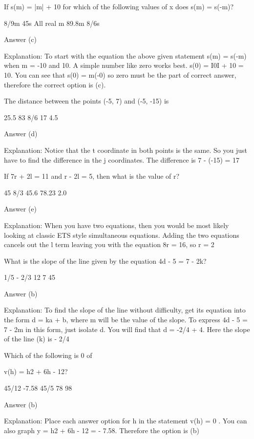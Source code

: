     If s(m) = |m| + 10 for which of the following values of x does s(m) = s(-m)?

        8/9m
        45s
        All real m
        89.8m
        8/6s 

    Answer (c)

     

    Explanation: To start with the equation the above given statement s(m) = s(-m) when m = -10 and 10. A simple number like zero works best. s(0) = Ι0Ι + 10 = 10. You can see that s(0) = m(-0) so zero must be the part of correct answer, therefore the correct option is (c).

     

    The distance between the points (-5, 7) and (-5, -15) is

        25.5
        83
        8/6
        17
        4.5 

    Answer (d)

    Explanation: Notice that the t coordinate in both points is the same. So you just have to find the difference in the j coordinates. The difference is 7 - (-15) = 17

    If 7r + 2l = 11 and r - 2l = 5, then what is the value of r?

        45
        8/3
        45.6
        78.23
        2.0 

    Answer (e)

    Explanation: When you have two equations, then you would be most likely looking at classic ETS style simultaneous equations. Adding the two equations cancels out the l term leaving you with the equation 8r = 16, so r = 2

    What is the slope of the line given by the equation 4d - 5 = 7 - 2k?

        1/5
        - 2/3
        12
        7
        45 

    Answer (b)

    Explanation: To find the slope of the line without difficulty, get its equation into the form d = ka + b, where m will be the value of the slope. To express 4d - 5 = 7 - 2m in this form, just isolate d. You will find that d = -2/4 + 4. Here the slope of the line (k) is - 2/4

    Which of the following is 0 of

    v(h) = h2 + 6h - 12?

        45/12
        -7.58
        45/5
        78
        98 

    Answer (b)

    Explanation: Place each answer option for h in the statement v(h) = 0 . You can also graph y = h2 + 6h - 12 = - 7.58. Therefore the option is (b) 


